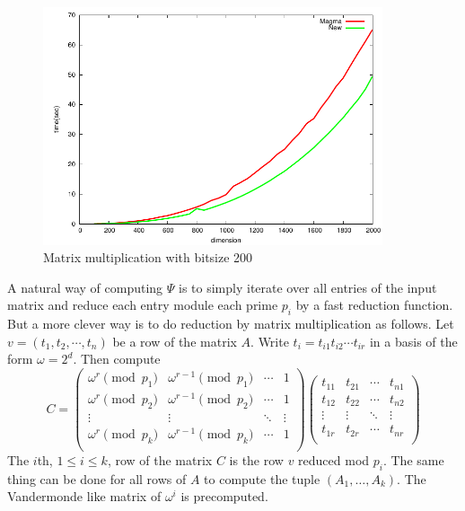 \begin{figure}[ht]
\setlength{\abovecaptionskip}{-0.5cm}
\begin{center}
\includegraphics[width = 10cm]{figures/MMtiming.pdf}
\end{center}
\caption{\small Matrix multiplication with bitsize 200}
\label{figure:MMtiming}
\end{figure}

A natural way of computing $\Psi$ is to simply iterate over all entries of the input matrix and 
reduce each entry module each prime $p_i$ by a fast reduction function. But a more clever way is to 
do reduction by matrix multiplication as follows. Let $v = (t_1, t_2, \cdots, t_n)$ be a row of the 
matrix $A$. Write $t_i = t_{i1}t_{i2}\cdots t_{ir}$ in a basis of the form $\omega = 2^d$. Then 
compute
\[
C = 
 \begin{pmatrix}
  \omega^r \pmod {p_1} & \omega^{r - 1} \pmod {p_1} & \cdots &  1\\
  \omega^r \pmod {p_2} & \omega^{r - 1} \pmod {p_2} & \cdots &  1\\
  \vdots  & \vdots  & \ddots & \vdots  \\
  \omega^r \pmod {p_k} & \omega^{r - 1} \pmod {p_k} & \cdots &  1\\
 \end{pmatrix}
 \begin{pmatrix}
  t_{11} & t_{21} & \cdots & t_{n1} \\
  t_{12} & t_{22} & \cdots & t_{n2} \\
  \vdots  & \vdots  & \ddots & \vdots  \\
  t_{1r} & t_{2r} & \cdots & t_{nr} \\
 \end{pmatrix}
\]
The $i$th, $1 \le i \le k$, row of the matrix $C$ is the row $v$ reduced mod $p_i$. The same thing 
can be done for all rows of $A$ to compute the tuple $(A_1, \dots, A_k)$. The Vandermonde like 
matrix of $\omega^i$ is precomputed.

